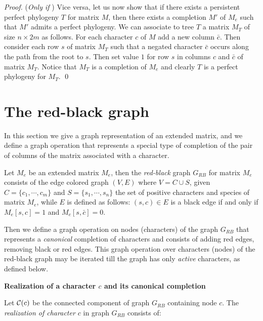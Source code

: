 \documentclass{llncs}
\newcommand{\grb}{$G_{RB}$ }
\begin{document}
\begin{proof}
 


({\em Only if }) Vice versa, let us now show that if there exists a persistent perfect phylogeny $T$ for matrix $M$, then there exists a completion $M'$ of $M_e$ such that $M'$ admits a perfect phylogeny.
We can associate to tree $T$ a matrix $M_{T}$ of size $n \times 2m$ as follows.
  For each  character $c$ of $M$ add a new column $\bar{c}$. Then consider each row $s$ of matrix $M_T$ such that
   a negated character $\bar{c}$ occurs along the path from the root to $s$. Then set  value $1$ for row $s$   in columns $c$  and $\bar{c}$ of matrix $M_T$.
Notice that  $M_T$ is a completion of $M_e$ and clearly $T$ is a perfect phylogeny for $M_T$. 
\qed
\end{proof}






\section{The red-black graph}
\label{section-graph}

 
In this section  we give a graph representation of  an extended matrix, and we define a graph operation that represents  a special type of completion of  the pair of  columns of the matrix associated with a  character.  


Let $M_e$ be an extended matrix $M_e$, then  the {\em red-black} graph $G_{RB}$ for matrix $M_e$ consists of the edge colored graph $(V,E)$ where $V= C \cup S$,  given $C= \{c_1, \cdots, c_m\}$ and $S = \{s_1, \cdots, s_n\}$ the set of positive characters and species of matrix $M_e$, while $E$ is defined as follows:
$(s,c) \in E$ is a black edge  if and only if $M_e[s,c]=1$ and $M_e[s,\bar{c}]=0$.




 




Then we define a graph operation  on nodes (characters) of the graph \grb that represents a {\em canonical} completion of characters  and consists of adding red edges, removing black or red edges. 
This  graph  operation  over characters (nodes)  of  the red-black graph may be iterated till the graph has only {\em active} characters, as defined below.




\noindent
{\bf Realization of a character $c$  and its canonical completion}

Let   ${\cal C}(c)$ be the connected component of graph \grb containing node $c$.  The {\it realization of   character $c$}  in graph \grb  consists of:
\end{document}
